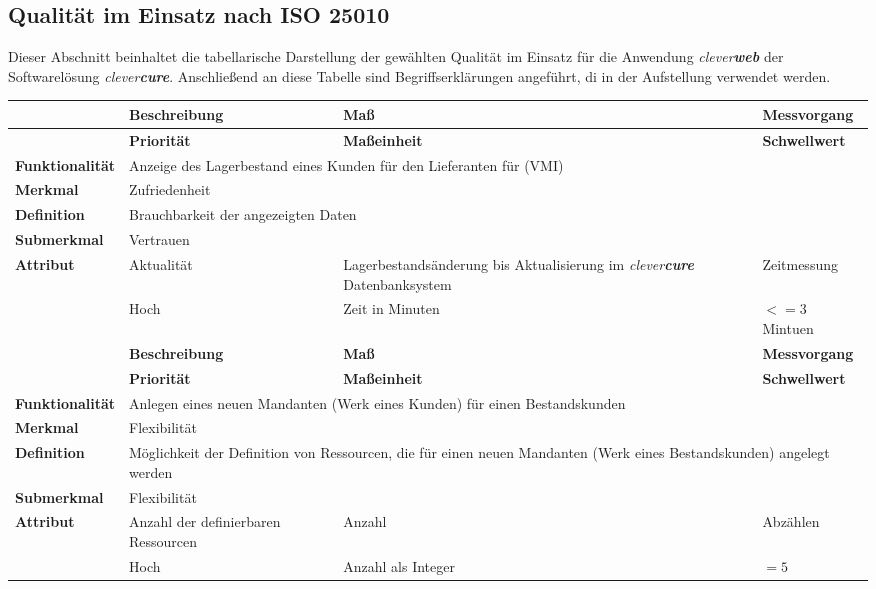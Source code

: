 \subsection{Qualität im Einsatz nach ISO 25010}
\label{sec:qualtity-quality-in-use}
Dieser Abschnitt beinhaltet die tabellarische Darstellung der gewählten Qualität im Einsatz für die Anwendung \emph{clever\textbf{web}} der Softwarelösung \emph{clever\textbf{cure}}. Anschließend an diese Tabelle sind Begriffserklärungen angeführt, di in der Aufstellung verwendet werden.
\newline
\newline
\bgroup
\def\arraystretch{1.5}%
\begin{tabularx}{\textwidth}{ p{70pt} | X | X | X }
	\hline
	& \textbf{Beschreibung} & \textbf{Maß} & \textbf{Messvorgang} \\ \hline
	& \textbf{Priorität} & \textbf{Maßeinheit} & \textbf{Schwellwert} \\ \hline
	\textbf{Funktionalität} & \multicolumn{3}{p{300pt}}{Anzeige des  Lagerbestand eines Kunden für den Lieferanten für (VMI)} \\ \hline
	\textbf{Merkmal} & \multicolumn{3}{X}{Zufriedenheit} \\ \hline
	\textbf{Definition} & \multicolumn{3}{p{380pt}}{Brauchbarkeit der angezeigten Daten} \\ \hline
	\textbf{Submerkmal} & \multicolumn{3}{X}{Vertrauen} \\ \hline 
	\textbf{Attribut} & Aktualität & Lagerbestandsänderung bis Aktualisierung im \emph{clever\textbf{cure}} Datenbanksystem & Zeitmessung  \\ \hline
	& Hoch               & Zeit in Minuten & $<= 3$ Mintuen  \\ 
	\hline 
	\hline 
	& \textbf{Beschreibung} & \textbf{Maß} & \textbf{Messvorgang} \\ \hline
	& \textbf{Priorität} & \textbf{Maßeinheit} & \textbf{Schwellwert} \\ \hline
	\textbf{Funktionalität} & \multicolumn{3}{p{300pt}}{Anlegen eines neuen Mandanten (Werk eines Kunden) für einen Bestandskunden} \\ \hline
	\textbf{Merkmal} & \multicolumn{3}{X}{Flexibilität} \\ \hline
	\textbf{Definition} & \multicolumn{3}{p{380pt}}{Möglichkeit der Definition von Ressourcen, die für einen neuen Mandanten (Werk eines Bestandskunden) angelegt werden} \\ \hline
	\textbf{Submerkmal} & \multicolumn{3}{X}{Flexibilität} \\ \hline 
	\textbf{Attribut} & Anzahl der definierbaren Ressourcen & Anzahl  & Abzählen  \\ \hline
	& Hoch               & Anzahl als Integer & $= 5$  \\ \hline
\end{tabularx}
